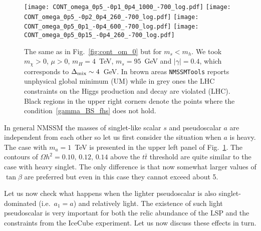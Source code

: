 \documentclass[12pt,twoside]{article}
\begin{document}
%
\begin{figure}[t]
\center
\texttt{[image: CONT\_omega\_0p5\_-0p1\_0p4\_1000\_-700\_log.pdf]}\hspace{-4ex}
\texttt{[image: CONT\_omega\_0p5\_-0p2\_0p4\_260\_-700\_log.pdf]}
\texttt{[image: CONT\_omega\_0p5\_0p1\_-0p4\_600\_-700\_log.pdf]}\hspace{-4ex}
\texttt{[image: CONT\_omega\_0p5\_0p15\_-0p4\_260\_-700\_log.pdf]}
\caption{The same as in Fig.~\ref{fig:cont_om_0} but for $m_s<m_h$. 
We took $m_{\chi}>0$, $\mu>0$, $m_H=4$~TeV, $m_s=95$~GeV  and $|\gamma|=0.4$, which corresponds to $\Delta_{\rm mix}\sim 4$~GeV. 
In brown areas {\tt NMSSMTools} reports unphysical global minimum (UM) while in grey ones the LHC constraints on the Higgs production and decay are
violated (LHC). Black
regions in the upper right corners denote the points where the condition~\eqref{gamma_BS_fhs} does not hold.
}
\label{fig:cont_om_fhs}
\end{figure}
%
In general NMSSM the masses of singlet-like scalar $s$ and pseudoscalar $a$ 
are independent from each other so let us first consider the situation
when $a$ is heavy. The case with $m_a=1$~TeV is presented in the upper left 
panel of Fig.~\ref{fig:cont_om_fhs}. The contours of 
$\Omega h^2=0.10,\,0.12,\,0.14$ above the $t\bar{t}$ threshold are quite 
similar to the case with heavy singlet. The only difference is that now 
somewhat larger values of $\tan\beta$ are preferred but
even in this case they cannot exceed about 5. 


Let us now check what happens when the lighter pseudoscalar is also 
singlet-dominated (i.e.~$a_1=a$) and relatively light. The existence 
of such light pseudoscalar is very important for both the relic abundance 
of the LSP and the constraints from the IceCube experiment. 
Let us now discuss these effects in turn.
\end{document}
